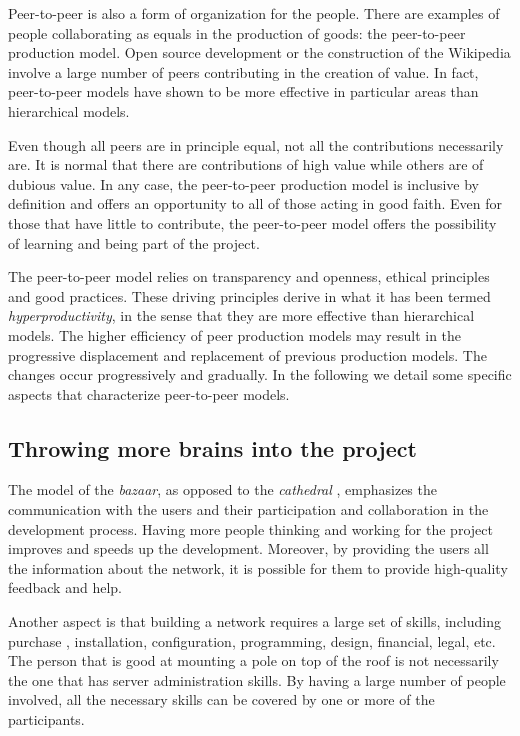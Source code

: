 \documentclass[journal]{IEEEtran}
\begin{document}
Peer-to-peer is also a form of organization for the people.
There are examples of people collaborating as equals in the production of goods: the peer-to-peer production model.
Open source development or the construction of the Wikipedia involve a large number of peers contributing in the creation of value.
In fact, peer-to-peer models have shown to be more effective in particular areas than hierarchical models.

Even though all peers are in principle equal, not all the contributions necessarily are.
It is normal that there are contributions of high value while others are of dubious value.
In any case, the peer-to-peer production model is inclusive by definition and offers an opportunity to all of those acting in good faith.
Even for those that have little to contribute, the peer-to-peer model offers the possibility of learning and being part of the project.

The peer-to-peer model relies on transparency and openness, ethical principles and good practices.
These driving principles derive in what it has been termed \emph{hyperproductivity}, in the sense that they are more effective than hierarchical models.
The higher efficiency of peer production models may result in the progressive displacement and replacement of previous production models.
The changes occur progressively and gradually.
In the following we detail some specific aspects that characterize peer-to-peer models.

\subsection{Throwing more brains into the project}

The model of the \emph{bazaar}, as opposed to the \emph{cathedral} \cite{raymond1999cb}, emphasizes the communication with the users and their participation and collaboration in the development process.
Having more people thinking and working for the project improves and speeds up the development.
Moreover, by providing the users all the information about the network, it is possible for them to provide high-quality feedback and help.

Another aspect is that building a network requires a large set of skills, including purchase , installation, configuration, programming, design, financial, legal, etc.
The person that is good at mounting a pole on top of the roof is not necessarily the one that has server administration skills.
By having a large number of people involved, all the necessary skills can be covered by one or more of the participants.
\end{document}
